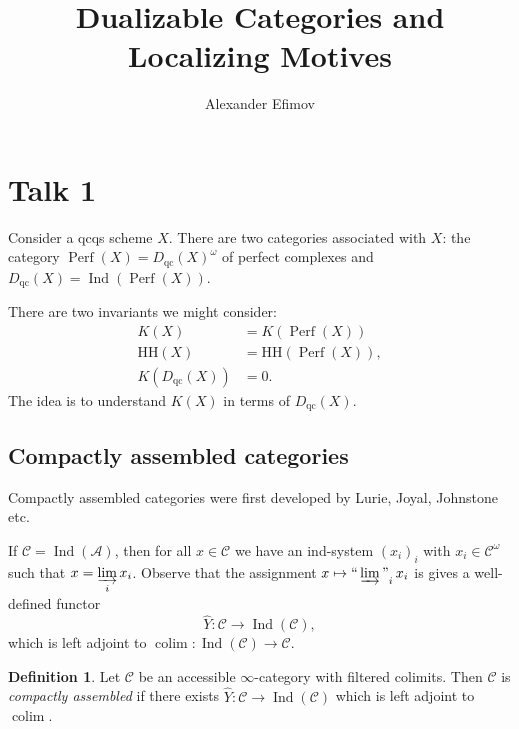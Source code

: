 \documentclass[draft]{amsart}
\renewcommand{\H}{\mathrm{H}}
\newcommand{\wh}[1]{\widehat{#1}}
\newcommand{\cat}[1]{\mathcal{#1}}
\DeclareMathOperator{\Ind}{Ind}
\DeclareMathOperator{\Perf}{Perf}
\DeclareMathOperator*{\indinjlim}{\text{``}\varinjlim\text{''}} %
\DeclareMathOperator*{\colim}{colim}
\theoremstyle{definition}
\newtheorem{defn}[thm]{Definition}
\begin{document}
\title{Dualizable Categories and Localizing Motives}
\author{Alexander Efimov}
\maketitle
\tableofcontents

\section{Talk 1}
Consider a qcqs scheme $X$. There are two categories associated with $X$: the category $\Perf(X)= D_{\mathrm{qc}}(X)^{\omega}$ of perfect complexes and $D_{\mathrm{qc}}(X) = \Ind(\Perf(X))$.

There are two invariants we might consider:
\begin{align*}
K(X) &= K(\Perf(X)) \\
\H\H(X) &= \H\H(\Perf(X)), \\
K(D_{\mathrm{qc}}(X)) &= 0.
\end{align*}
The idea is to understand $K(X)$ in terms of $D_{\mathrm{qc}}(X)$.

\subsection{Compactly assembled categories}
Compactly assembled categories were first developed by Lurie, Joyal, Johnstone etc.

If $\cat C = \Ind(\cat A)$, then for all $x\in \cat C$ we have an ind-system $(x_i)_i$ with $x_i\in \cat C^\omega$ such that $x = \varinjlim\limits_i x_i$. Observe that the assignment $x\mapsto \indinjlim_i x_i$ is gives a well-defined functor 
\[
\wh{Y}\colon \cat C \to \Ind(\cat C),
\]
which is left adjoint to $\colim\colon \Ind(\cat C)\to \cat C$.

\begin{defn}
Let $\cat C$ be an accessible $\infty$-category with filtered colimits. Then $\cat C$ is \emph{compactly assembled} if there exists $\wh{Y}\colon \cat C\to \Ind(\cat C)$ which is left adjoint to $\colim$.
\end{defn}
\end{document}
